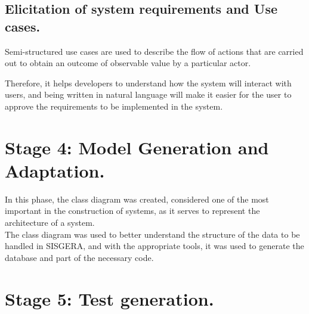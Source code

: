 \documentclass[]{scrartcl}
\begin{document}
	\subsection*{Elicitation of system requirements and Use cases.}
	Semi-structured use cases are used to describe the flow of actions that are carried out to obtain an outcome of observable value by a particular actor.
	
	Therefore, it helps developers to understand how the system will interact with users, and being written in natural language will make it easier for the user to approve the requirements to be implemented in the system.

\section*{Stage 4: Model Generation and Adaptation.}
	In this phase, the class diagram was created, considered one of the most important in the construction of systems, as it serves to represent the architecture of a system.\\
	The class diagram was used to better understand the structure of the data to be handled in SISGERA, and with the appropriate tools, it was used to generate the database and part of the necessary code.

\section*{Stage 5: Test generation.}
\end{document}
